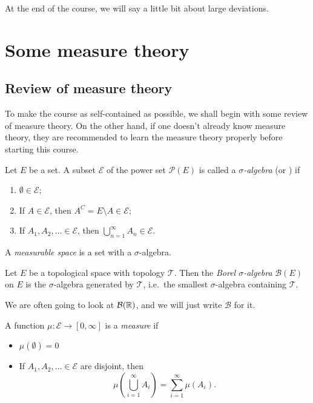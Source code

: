 \documentclass[a4paper]{article}
\begin{document}
At the end of the course, we will say a little bit about large deviations.
\section{Some measure theory}
\subsection{Review of measure theory}
To make the course as self-contained as possible, we shall begin with some review of measure theory. On the other hand, if one doesn't already know measure theory, they are recommended to learn the measure theory properly before starting this course.

\begin{defi}
  Let $E$ be a set. A subset $\mathcal{E}$ of the power set $\mathcal{P}(E)$ is called a \emph{$\sigma$-algebra} (or ) if
  \begin{enumerate}
    \item $\emptyset \in \mathcal{E}$;
    \item If $A \in \mathcal{E}$, then $A^C = E \setminus A \in \mathcal{E}$;
    \item If $A_1, A_2, \ldots \in \mathcal{E}$, then $\bigcup_{n = 1}^\infty A_n \in \mathcal{E}$.
  \end{enumerate}
\end{defi}

\begin{defi}
  A \emph{measurable space} is a set with a $\sigma$-algebra.
\end{defi}


\begin{defi}
  Let $E$ be a topological space with topology $\mathcal{T}$. Then the \emph{Borel $\sigma$-algebra} $\mathcal{B}(E)$ on $E$ is the $\sigma$-algebra generated by $\mathcal{T}$, i.e.\ the smallest $\sigma$-algebra containing $\mathcal{T}$.
\end{defi}

We are often going to look at $\mathcal{B}(\mathbb{R})$, and we will just write $\mathcal{B}$ for it.

\begin{defi}[Measure]
  A function $\mu: \mathcal{E} \to [0, \infty]$ is a \emph{measure} if
  \begin{itemize}
    \item $\mu(\emptyset) = 0$
    \item If $A_1, A_2, \ldots \in \mathcal{E}$ are disjoint, then
      \[
        \mu \left(\bigcup_{i = 1}^\infty A_i \right) = \sum_{i = 1}^\infty \mu(A_i).
      \]
  \end{itemize}
\end{defi}
\end{document}
